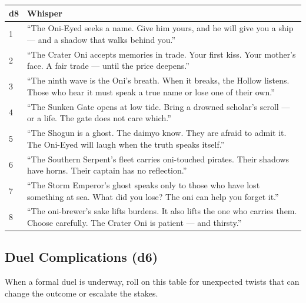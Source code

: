 \begin{longtable}{|p{1.5cm}|p{10cm}|}
\hline
\rowcolor{gray!20}
\textbf{d8} & \textbf{Whisper} \\
\hline
1 & ``The Oni-Eyed seeks a name. Give him yours, and he will give you a ship --- and a shadow that walks behind you.'' \\
\hline
2 & ``The Crater Oni accepts memories in trade. Your first kiss. Your mother's face. A fair trade --- until the price deepens.'' \\
\hline
3 & ``The ninth wave is the Oni's breath. When it breaks, the Hollow listens. Those who hear it must speak a true name or lose one of their own.'' \\
\hline
4 & ``The Sunken Gate opens at low tide. Bring a drowned scholar's scroll --- or a life. The gate does not care which.'' \\
\hline
5 & ``The Shogun is a ghost. The daimyo know. They are afraid to admit it. The Oni-Eyed will laugh when the truth speaks itself.'' \\
\hline
6 & ``The Southern Serpent's fleet carries oni-touched pirates. Their shadows have horns. Their captain has no reflection.'' \\
\hline
7 & ``The Storm Emperor's ghost speaks only to those who have lost something at sea. What did you lose? The oni can help you forget it.'' \\
\hline
8 & ``The oni-brewer's sake lifts burdens. It also lifts the one who carries them. Choose carefully. The Crater Oni is patient --- and thirsty.'' \\
\hline
\end{longtable}

\subsection*{Duel Complications (d6)}
\label{sec:nihori-duel-complications}

When a formal duel is underway, roll on this table for unexpected twists that can change the outcome or escalate the stakes.

